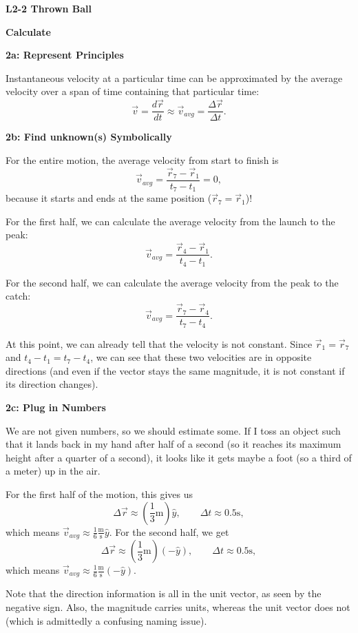\documentclass[]{article}
\begin{document}
\newpage
\begin{TeacherMargin}
\noindent\textbf{L2-2 Thrown Ball}

\noindent\textbf{Calculate}

\noindent\textbf{2a: Represent Principles}

Instantaneous velocity at a particular time can be approximated by the average velocity over a span of time containing that particular time:
\[
\vec{v} = \frac{d\vec{r}}{dt} \approx \vec{v}_{avg} = \frac{\Delta\vec{r}}{\Delta t}.
\]

\noindent\textbf{2b: Find unknown(s) Symbolically}

For the entire motion, the average velocity from start to finish is
\[
\vec{v}_{avg} = \frac{\vec{r}_{7}-\vec{r}_{1}}{t_{7}-t_{1}} = 0,
\]
because it starts and ends at the same position ($\vec{r}_{7}=\vec{r}_{1}$)!

For the first half, we can calculate the average velocity from the launch to the peak:
\[
\vec{v}_{avg} = \frac{\vec{r}_{4}-\vec{r}_{1}}{t_{4}-t_{1}}.
\]

For the second half, we can calculate the average velocity from the peak to the catch:
\[
\vec{v}_{avg} = \frac{\vec{r}_{7}-\vec{r}_{4}}{t_{7}-t_{4}}.
\]

At this point, we can already tell that the velocity is not constant. Since $\vec{r}_{1} = \vec{r}_{7}$ and $t_{4}-t_{1} = t_{7}-t_{4}$, we can see that these two velocities are in opposite directions (and even if the vector stays the same magnitude, it is not constant if its direction changes).

\noindent\textbf{2c: Plug in Numbers}

We are not given numbers, so we should estimate some. If I toss an object such that it lands back in my hand after half of a second (so it reaches its maximum height after a quarter of a second), it looks like it gets maybe a foot (so a third of a meter) up in the air.

For the first half of the motion, this gives us
\[
\Delta\vec{r} \approx \left(\frac{1}{3} \text{m}\right) \hat{y}, \qquad \Delta t \approx 0.5 \text{s},
\]
which means $\vec{v}_{avg} \approx \frac{1}{6}\frac{\text{m}}{\text{s}}\hat{y}$. For the second half, we get
\[
\Delta\vec{r} \approx \left(\frac{1}{3} \text{m}\right) \left(-\hat{y}\right), \qquad \Delta t \approx 0.5 \text{s},
\]
which means $\vec{v}_{avg} \approx \frac{1}{6}\frac{\text{m}}{\text{s}}\left(-\hat{y}\right)$.

Note that the direction information is all in the unit vector, as seen by the negative sign. Also, the magnitude carries units, whereas the unit vector does not (which is admittedly a confusing naming issue).
\end{TeacherMargin}
\end{document}
